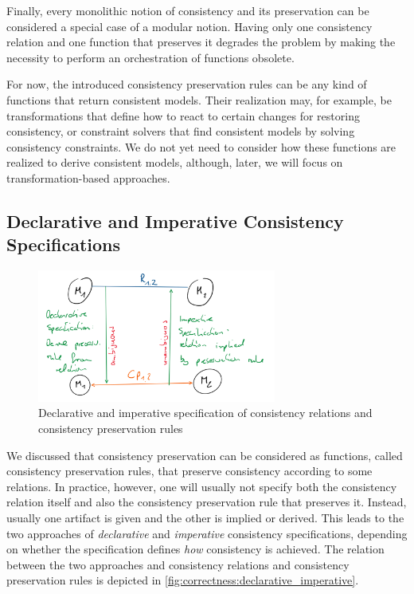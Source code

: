 \begin{remark} 
Finally, every monolithic notion of consistency and its preservation can be considered a special case of a modular notion. Having only one consistency relation and one function that preserves it degrades the problem by making the necessity to perform an orchestration of functions obsolete.
\end{remark}

For now, the introduced \glspl{consistency preservation rule} can be any kind of functions that return consistent models. 
Their realization may, for example, be transformations that define how to react to certain changes for restoring consistency, or constraint solvers that find consistent models by solving consistency constraints. 
We do not yet need to consider how these functions are realized to derive consistent models, although, later, we will focus on transformation-based approaches.


\subsection{Declarative and Imperative Consistency Specifications}

\begin{figure}
    \centering
    \includegraphics[width=0.7\textwidth]{figures/correctness/formal/declarative_imperative}
    \caption[Declarative and imperative consistency specification]{Declarative and imperative specification of consistency relations and consistency preservation rules}
    \label{fig:correctness:declarative_imperative}
\end{figure}

We discussed that consistency preservation can be considered as functions, called \glspl{consistency preservation rule}, that preserve consistency according to some relations.
In practice, however, one will usually not specify both the \gls{consistency relation} itself and also the \gls{consistency preservation rule} that preserves it.
Instead, usually one artifact is given and the other is implied or derived.
This leads to the two approaches of \emph{declarative} and \emph{imperative} consistency specifications, depending on whether the specification defines \emph{how} consistency is achieved.
The relation between the two approaches and \glspl{consistency relation} and \glspl{consistency preservation rule} is depicted in \autoref{fig:correctness:declarative_imperative}.

